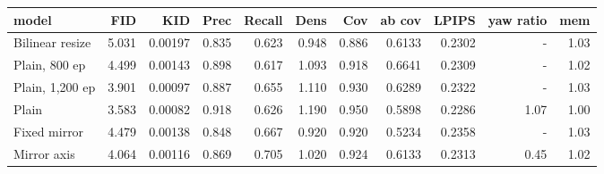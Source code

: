 \begin{tabular}{lrrrrrrrrrr}
\hline
model & FID & KID & Prec & Recall & Dens & Cov & ab cov & LPIPS & yaw ratio & mem \\
\hline
Bilinear resize & 5.031 & 0.00197 & 0.835 & 0.623 & 0.948 & 0.886 & 0.6133 & 0.2302 & - & 1.03 \\
Plain, 800 ep & 4.499 & 0.00143 & 0.898 & 0.617 & 1.093 & 0.918 & 0.6641 & 0.2309 & - & 1.02 \\
Plain, 1,200 ep & 3.901 & 0.00097 & 0.887 & 0.655 & 1.110 & 0.930 & 0.6289 & 0.2322 & - & 1.03 \\
Plain & 3.583 & 0.00082 & 0.918 & 0.626 & 1.190 & 0.950 & 0.5898 & 0.2286 & 1.07 & 1.00 \\
Fixed mirror & 4.479 & 0.00138 & 0.848 & 0.667 & 0.920 & 0.920 & 0.5234 & 0.2358 & - & 1.03 \\
Mirror axis & 4.064 & 0.00116 & 0.869 & 0.705 & 1.020 & 0.924 & 0.6133 & 0.2313 & 0.45 & 1.02 \\
\hline
\end{tabular}
